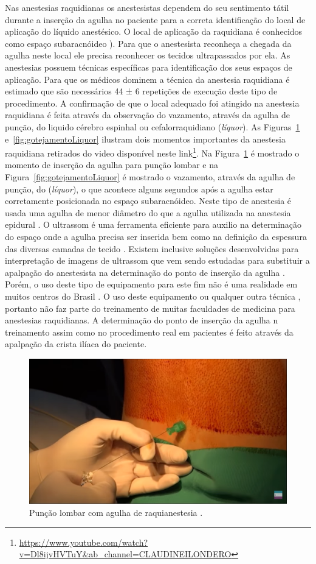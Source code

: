 Nas anestesias raquidianas os anestesistas dependem do seu sentimento tátil durante a inserção da agulha no paciente para a correta identificação do local de aplicação do líquido anestésico. O local de aplicação da raquidiana é conhecidos como espaço subaracnóideo \cite{Miller2009}). Para que o anestesista reconheça a chegada da agulha neste local ele precisa reconhecer os tecidos ultrapassados por ela. As anestesias possuem técnicas específicas para identificação dos seus espaços de aplicação. Para que os médicos dominem a técnica da anestesia raquidiana é estimado que são necessários 44 ± 6 repetições de execução deste tipo de procedimento. A confirmação de que o local adequado foi atingido na anestesia raquidiana é feita através da observação do vazamento, através da agulha de punção, do liquido cérebro espinhal ou cefalorraquidiano (\textit{líquor}). As Figuras~\ref{fig:puncaoLombar} e~\ref{fig:gotejamentoLiquor} ilustram dois momentos importantes da anestesia raquidiana retirados do video disponível neste link\footnote{\url{https://www.youtube.com/watch?v=Dl8ijvHVTuY&ab\_channel=CLAUDINEILONDERO}}. Na Figura~\ref{fig:puncaoLombar} é mostrado o momento de inserção da agulha para punção lombar e na Figura~\ref{fig:gotejamentoLiquor} é mostrado o vazamento, através da agulha de punção, do (\textit{líquor}), o que acontece alguns segundos após a agulha estar corretamente posicionada no espaço subaracnóideo. Neste tipo de anestesia é usada uma agulha de menor diâmetro do que a agulha utilizada na anestesia epidural \cite{Miller2009}. O ultrassom é uma ferramenta eficiente para auxilio na determinação do espaço onde a agulha precisa ser inserida \cite{Helayel2010, Soni2019} bem como na definição da espessura das diversas camadas de tecido \cite{Klingensmith2022}. Existem inclusive soluções desenvolvidas para interpretação de imagens de ultrassom que vem sendo estudadas para substituir a apalpação do anestesista na determinação do ponto de inserção da agulha \cite{Ni2021}. Porém, o uso deste tipo de equipamento para este fim não é uma realidade em muitos centros do Brasil \cite{Hamaji2016}. O uso deste equipamento ou qualquer outra técnica \cite{Berde2022}, portanto não faz parte do treinamento de muitas faculdades de medicina para anestesias raquidianas. A determinação do ponto de inserção da agulha n treinamento assim como no procedimento real em pacientes é feito através da apalpação da crista ilíaca do paciente.

\begin{figure}[!ht]
   \centering
   \includegraphics[width=0.6\linewidth]{capitulos/figuras/2.PuncaoLombar.png}
   \caption{Punção lombar com agulha de raquianestesia  \cite{Londero2018}.}
   \label{fig:puncaoLombar}
\end{figure}

